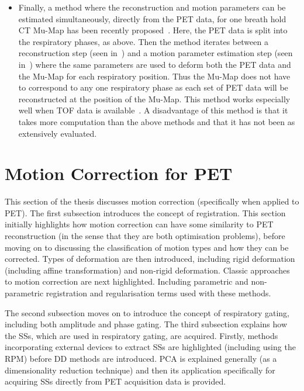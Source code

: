 \begin{itemize}
                \item Finally, a method where the reconstruction and motion parameters can be estimated simultaneously, directly from the \gls{PET} data, for one breath hold \gls{CT} \gls{Mu-Map} has been recently proposed~\parencite{JacobsonFesslerMotionCorrectionBib, Rezaei2018, Bousse2016a}. Here, the \gls{PET} data is split into the respiratory phases, as above. Then the method iterates between a reconstruction step (seen in~) and a motion parameter estimation step (seen in~) where the same parameters are used to deform both the \gls{PET} data and the \gls{Mu-Map} for each respiratory position. Thus the \gls{Mu-Map} does not have to correspond to any one respiratory phase as each set of \gls{PET} data will be reconstructed at the position of the \gls{Mu-Map}. This method works especially well when \gls{TOF} data is available~\parencite{Bousse2016}. A disadvantage of this method is that it takes more computation than the above methods and that it has not been as extensively evaluated.
            \end{itemize}
    
    \section{Motion Correction for PET} \label{sec:motion_correction_for_pet}
        This section of the thesis discusses motion correction (specifically when applied to \gls{PET}). The first subsection introduces the concept of registration. This section initially highlights how motion correction can have some similarity to \gls{PET} reconstruction (in the sense that they are both optimisation problems), before moving on to discussing the classification of motion types and how they can be corrected. Types of deformation are then introduced, including rigid deformation (including affine transformation) and non-rigid deformation. Classic approaches to motion correction are next highlighted. Including parametric and non-parametric registration and regularisation terms used with these methods.
        
        The second subsection moves on to introduce the concept of respiratory gating, including both amplitude and phase gating. The third subsection explains how the \glspl{SS}, which are used in respiratory gating, are acquired. Firstly, methods incorporating external devices to extract \glspl{SS} are highlighted (including using the \gls{RPM}) before \gls{DD} methods are introduced. \gls{PCA} is explained generally (as a dimensionality reduction technique) and then its application specifically for acquiring \glspl{SS} directly from \gls{PET} acquisition data is provided.
        
